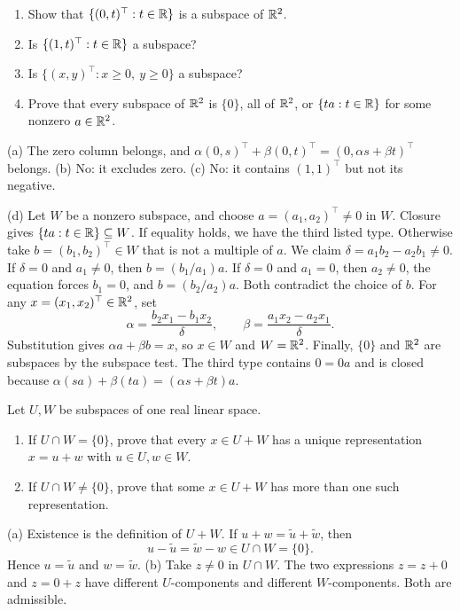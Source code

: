 \begin{problem}\label{ex:02:r2-subspaces}
\begin{enumerate}
\item Show that $\{(0,t)^\top:t\in\mathbb R\}$ is a subspace of $\mathbb R^2$.
\item Is $\{(1,t)^\top:t\in\mathbb R\}$ a subspace?
\item Is $\{(x,y)^\top:x\geqslant0,\ y\geqslant0\}$ a subspace?
\item Prove that every subspace of $\mathbb R^2$ is $\{0\}$, all of $\mathbb R^2$,
or $\{ta:t\in\mathbb R\}$ for some nonzero $a\in\mathbb R^2$.
\end{enumerate}
\end{problem}
\begin{solution}
(a) The zero column belongs, and
$\alpha(0,s)^\top+\beta(0,t)^\top=(0,\alpha s+\beta t)^\top$ belongs.
(b) No: it excludes zero.
(c) No: it contains $(1,1)^\top$ but not its negative.

(d) Let $W$ be a nonzero subspace, and choose $a=(a_1,a_2)^\top\ne0$ in $W$.
Closure gives $\{ta:t\in\mathbb R\}\subseteq W$.
If equality holds, we have the third listed type.
Otherwise take $b=(b_1,b_2)^\top\in W$ that is not a multiple of $a$.
We claim $\delta=a_1b_2-a_2b_1\ne0$.
If $\delta=0$ and $a_1\ne0$, then $b=(b_1/a_1)a$.
If $\delta=0$ and $a_1=0$, then $a_2\ne0$, the equation forces $b_1=0$,
and $b=(b_2/a_2)a$. Both contradict the choice of $b$.
For any $x=(x_1,x_2)^\top\in\mathbb R^2$, set
\[
\alpha=\frac{b_2x_1-b_1x_2}{\delta},\qquad
\beta=\frac{a_1x_2-a_2x_1}{\delta}.
\]
Substitution gives $\alpha a+\beta b=x$, so $x\in W$ and $W=\mathbb R^2$.
Finally, $\{0\}$ and $\mathbb R^2$ are subspaces by the subspace test.
The third type contains $0=0a$ and is closed because
$\alpha(sa)+\beta(ta)=(\alpha s+\beta t)a$.
\end{solution}

\begin{problem}\label{ex:02:sum-uniqueness}
Let $U,W$ be subspaces of one real linear space.
\begin{enumerate}
\item If $U\cap W=\{0\}$, prove that every $x\in U+W$ has a unique
representation $x=u+w$ with $u\in U,w\in W$.
\item If $U\cap W\ne\{0\}$, prove that some $x\in U+W$ has more than one such representation.
\end{enumerate}
\end{problem}
\begin{solution}
(a) Existence is the definition of $U+W$.
If $u+w=\widetilde u+\widetilde w$, then
\[
u-\widetilde u=\widetilde w-w\in U\cap W=\{0\}.
\]
Hence $u=\widetilde u$ and $w=\widetilde w$.
(b) Take $z\ne0$ in $U\cap W$. The two expressions $z=z+0$ and $z=0+z$
have different $U$-components and different $W$-components. Both are admissible.
\end{solution}

